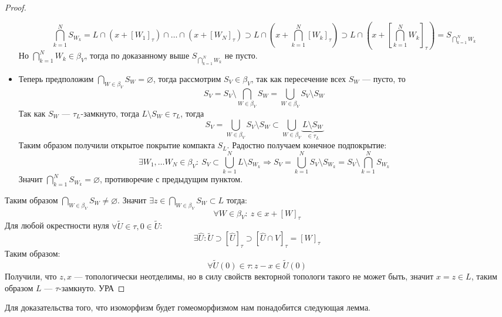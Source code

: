 \begin{proof}
\begin{itemize}
		$$
		\bigcap_{k=1}^N S_{W_k} = L \cap (x + [W_1]_\tau)\cap \dots \cap (x + [W_N]_\tau) \supset L \cap \left( x + \bigcap_{k=1}^N [W_k]_\tau\right) \supset L \cap \left(x + \left[\bigcap_{k=1}^N W_k\right]_\tau\right) = S_{\bigcap_{k=1}^N W_k}
		$$
		Но $\bigcap_{k=1}^N W_k \in \beta_V$, тогда по доказанному выше $S_{\bigcap_{k=1}^N W_k}$ не пусто.
		\item Теперь предположим $\bigcap_{W \in \beta_V}S_W = \varnothing$, тогда рассмотрим $S_V \in \beta_V$, так как пересечение всех $S_W$ --- пусто, то 
		$$
		S_V = S_V \setminus \bigcap_{W \in \beta_V}S_W  = \bigcup_{W \in \beta_V} S_V \setminus S_W 
		$$
		Так как $S_W$ --- $\tau_L$-замкнуто, тогда $L \setminus S_W \in \tau_L$, тогда 
		$$
		S_V = \bigcup_{W \in \beta_V} S_V \setminus S_W \subset \bigcup_{W \in \beta_V}\underbrace{L \setminus S_W}_{\in \tau_L} 
		$$
		Таким образом получили открытое покрытие компакта $S_L$. Радостно получаем конечное подпокрытие:
		$$
		\exists W_1, \dots W_N \in \beta_V: \ S_V \subset \bigcup_{k=1}^N L \setminus S_{W_k} \Rightarrow S_V = \bigcup_{k=1}^N S_V \setminus S_{W_k}  = S_V \setminus \bigcap_{k=1}^N S_{W_k}
		$$
		Значит $\bigcap_{k=1}^N S_{W_k} = \varnothing$, противоречие с предыдущим пунктом.
	\end{itemize}  
	Таким образом $\bigcap_{W \in \beta_V}S_W \neq \varnothing$. Значит $\exists z \in \bigcap_{W \in \beta_V}S_W  \subset L$ тогда:
	$$
	\forall W \in \beta_V: \ z \in x + [W]_\tau 
	$$
	Для любой окрестности нуля $\forall \tilde{U} \in \tau, 0 \in \tilde{U}$:
	$$
	\exists \hat{U}: \tilde{U} \supset 	[\hat{U}]_\tau  \supset [\hat{U}\cap V]_\tau = [W]_\tau
	$$
	Таким образом: 
	$$
	\forall \tilde{U}(0) \in \tau: z - x \in \tilde{U}(0) 
	$$
	Получили, что $z,x$ --- топологически неотделимы, но в силу свойств векторной топологи такого не может быть, значит $x = z \in L$, таким образом $L$ --- $\tau$-замкнуто. УРА
\end{proof}
Для доказательства того, что изоморфизм будет гомеоморфизмом нам понадобится следующая лемма.

